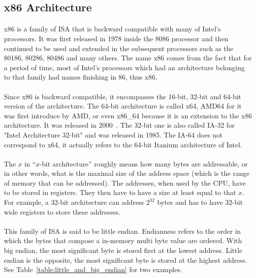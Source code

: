 \subsection{x86 Architecture}
\paragraph{}
x86 is a family of ISA that is backward compatible with many of Intel's processors. It was first released in 1978 inside the 8086 processor and then continued to be used and extended in the subsequent processors such as the 80186, 80286, 80486 and many others. The name x86 comes from the fact that for a period of time, most of Intel's processors which had an architecture belonging to that family had names finishing in 86, thus x86. 

\paragraph{}
Since x86 is backward compatible, it encompasses the 16-bit, 32-bit and 64-bit version of the architecture. The 64-bit architecture is called x64, AMD64 for it was first introduce by AMD, or even x86\_64 because it is an extension to the x86 architecture. It was released in 2000~\cite{amd64}. The 32-bit one is also called IA-32 for "Intel Architecture 32-bit" and was released in 1985. The IA-64 does not correspond to x64, it actually refers to the 64-bit Itanium architecture of Intel. 

\paragraph{}
The $x$ in “$x$-bit architecture” roughly means how many bytes are addressable, or in other words, what is the maximal size of the address space (which is the range of memory that can be addressed). The addresses, when used by the CPU, have to be stored in registers. They then have to have a size at least equal to that $x$. For example, a 32-bit architecture can address $2^{32}$ bytes and has to have $32$-bit wide registers to store these addresses.

\paragraph{}
This family of ISA is said to be little endian. Endianness refers to the order in which the bytes that compose a in-memory multi byte value are ordered. With big endian, the most significant byte is stored first at the lowest address. Little endian is the opposite, the most significant byte is stored at the highest address. See Table~\ref{table:little_and_big_endian} for two examples.

